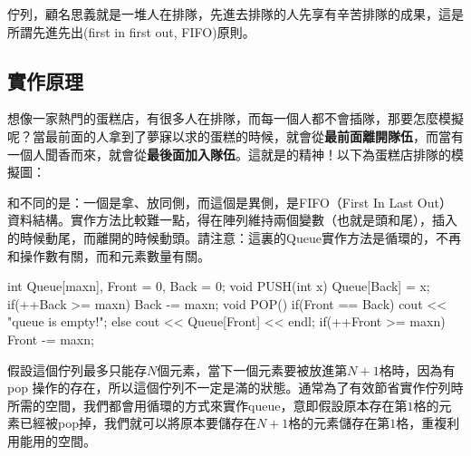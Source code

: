 \documentclass[main.tex]{subfiles}
\begin{document}
佇列，顧名思義就是一堆人在排隊，先進去排隊的人先享有辛苦排隊的成果，這是所謂先進先出(first in first out, FIFO)原則。

\subsection{實作原理}
想像一家熱門的蛋糕店，有很多人在排隊，而每一個人都不會插隊，那要怎麼模擬呢？當最前面的人拿到了夢寐以求的蛋糕的時候，就會從\textbf{最前面離開隊伍}，而當有一個人聞香而來，就會從\textbf{最後面加入隊伍}。這就是的精神！以下為蛋糕店排隊的模擬圖：
\begin{center}
\end{center}
和不同的是：一個是拿、放同側，而這個是異側，是FIFO（First In Last Out）資料結構。實作方法比較難一點，得在陣列維持兩個變數（也就是頭和尾），插入的時候動尾，而離開的時候動頭。請注意：這裏的Queue實作方法是循環的，不再和操作數有關，而和元素數量有關。
\begin{C++}
int Queue[maxn], Front = 0, Back = 0;
void PUSH(int x) {
	Queue[Back] = x;
    if(++Back >= maxn) Back -= maxn;
}
void POP(){
    if(Front == Back)
        cout << "queue is empty!\n";
    else{
    	cout << Queue[Front] << endl;
        if(++Front >= maxn) Front -= maxn;
    }
}
\end{C++}
\indent\indent 假設這個佇列最多只能存$N$個元素，當下一個元素要被放進第$N+1$格時，因為有 pop 操作的存在，所以這個佇列不一定是滿的狀態。通常為了有效節省實作佇列時所需的空間，我們都會用循環的方式來實作queue，意即假設原本存在第$1$格的元素已經被pop掉，我們就可以將原本要儲存在$N+1$格的元素儲存在第$1$格，重複利用能用的空間。
\end{document}
